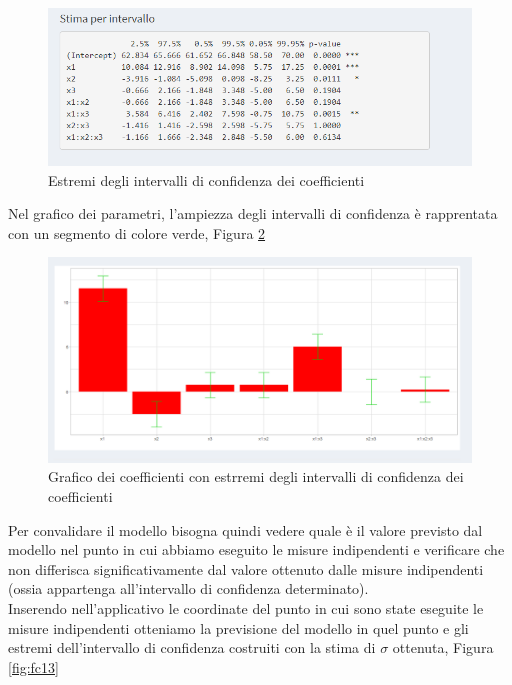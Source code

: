 \documentclass[
  11pt,
]{book}
\begin{document}
\begin{figure}

{\centering \includegraphics[width=1\linewidth]{Immagini/Fatt_compl/11_intconf} 

}

\caption{Estremi degli intervalli di confidenza dei coefficienti}\label{fig:fc11}
\end{figure}

Nel grafico dei parametri, l'ampiezza degli intervalli di confidenza è
rapprentata con un segmento di colore verde, Figura \ref{fig:fc12}

\begin{figure}

{\centering \includegraphics[width=1\linewidth]{Immagini/Fatt_compl/12_intcong_graf} 

}

\caption{Grafico dei coefficienti con estrremi degli intervalli di confidenza dei coefficienti}\label{fig:fc12}
\end{figure}

Per convalidare il modello bisogna quindi vedere quale è il valore
previsto dal modello nel punto in cui abbiamo eseguito le misure
indipendenti e verificare che non differisca significativamente dal
valore ottenuto dalle misure indipendenti (ossia appartenga
all'intervallo di confidenza determinato).\\
Inserendo nell'applicativo le coordinate del punto in cui sono state
eseguite le misure indipendenti otteniamo la previsione del modello in
quel punto e gli estremi dell'intervallo di confidenza costruiti con la
stima di \(\sigma\) ottenuta, Figura \ref{fig:fc13}
\end{document}
